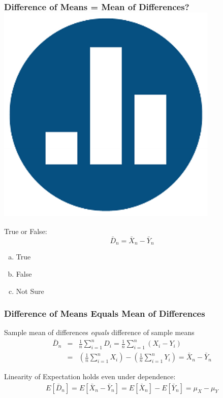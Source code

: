 \begin{frame}
\frametitle{Difference of Means = Mean of Differences?\hfill \includegraphics[scale = 0.05]{./images/clicker}}

True or False:
	$$\bar{D}_n = \bar{X}_n - \bar{Y}_n$$

\begin{enumerate}[(a)]
	\item True
	\item False
	\item Not Sure
\end{enumerate}

\end{frame}
\begin{frame}
\frametitle{Difference of Means Equals Mean of Differences}

\vspace{1em}
\alert{Sample mean of differences \emph{equals} difference of sample means}
\begin{eqnarray*}
	\bar{D}_n &=& \frac{1}{n}\sum_{i=1}^n D_i = \frac{1}{n}\sum_{i=1}^n (X_i - Y_i)\\
	& =& \left(\frac{1}{n}\sum_{i=1}^n X_i \right)- \left(\frac{1}{n}\sum_{i=1}^n Y_i \right)= \bar{X}_n - \bar{Y}_n
\end{eqnarray*}



\vspace{2em}

\alert{Linearity of Expectation holds even under dependence:}
\begin{eqnarray*}
	E[\bar{D}_n] = E[\bar{X}_n - \bar{Y}_n] = E[\bar{X}_n] - E[\bar{Y}_n] = \mu_X - \mu_Y
\end{eqnarray*}


\end{frame}

